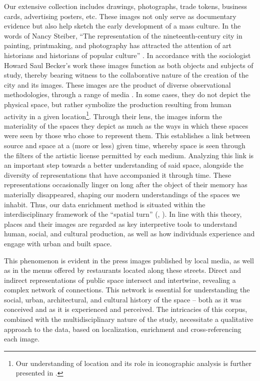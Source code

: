 \documentclass[12pt, a4paper, twocolumn]{article}
\begin{document}
Our extensive collection includes drawings, photographs, trade tokens, business cards, advertising posters, etc. These images not only serve as documentary evidence but also help sketch the early development of a mass culture. In the words of Nancy Steiber, ``The representation of the nineteenth-century city in painting, printmaking, and photography has attracted the attention of art historians and historians of popular culture'' \parencite[388]{stieberMicrohistoryModernCity1999}. In accordance with the sociologist Howard Saul Becker's work these images function as both objects and subjects of study, thereby bearing witness to the collaborative nature of the creation of the city and its images. These images are the product of diverse observational methodologies, through a range of media \parencite{craryTechniquesObserverVision2005}. In some cases, they do not depict the physical space, but rather symbolize the production resulting from human activity in a given location\footnote{
    Our understanding of location and its role in iconographic analysis is further presented in \parencite{kerveganMarqueLieuDans2023}.
}. Through their lens, the images inform the materiality of the spaces they depict as much as the ways in which these spaces were seen by those who chose to represent them. This establishes a link between source and space at a (more or less) given time, whereby space is seen through the filters of the artistic license permitted by each medium. Analyzing this link is an important step towards a better understanding of said space, alongside the diversity of representations that have accompanied it through time. These representations occasionally linger on long after the object of their memory has materially disappeared, shaping our modern understandings of the spaces we inhabit. Thus, our data enrichment method is situated within the interdisciplinary framework of the ``spatial turn'' (\cite{85d83bc2eded406fa8e31f427290f816}, \cite{besse_approches_2010}). In line with this theory, places and their images are regarded as key interpretive tools to understand human, social, and cultural production, as well as how individuals experience and engage with urban and built space.

This phenomenon is evident in the press images published by local media, as well as in the menus offered by restaurants located along these streets. Direct and indirect representations of public space intersect and intertwine, revealing a complex network of connections. This network is essential for understanding the social, urban, architectural, and cultural history of the space -- both as it was conceived and as it is experienced and perceived. The intricacies of this corpus, combined with the multidisciplinary nature of the study, necessitate a qualitative approach to the data, based on localization, enrichment and cross-referencing each image. 
\end{document}
